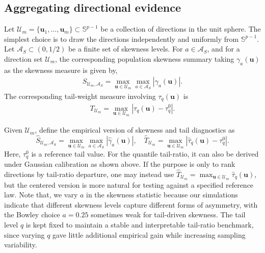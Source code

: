 \documentclass[11pt]{article}
\theoremstyle{plain}
\theoremstyle{definition}
\theoremstyle{remark}
\def\u{\bm{u}}
\newcommand{\abs}[1]{\left\lvert #1 \right\rvert}
\begin{document}
\subsection{Aggregating directional evidence}
\label{subsec:aggregation}

Let $\mathcal U_m=\{\u_1,\ldots,\u_m\}\subset \mathbb{S}^{p-1}$ be a collection of directions in the unit sphere. The simplest choice is to draw the directions independently and uniformly from \(\mathbb{S}^{p-1}\). Let \(\mathcal A_S\subset(0,1/2)\) be a finite set of skewness levels. For \(a\in\mathcal A_S\), and for a direction set \(\mathcal U_m\), the corresponding population skewness summary taking \(\gamma_{a}(\u)\) as the skewness measure is given by,
\begin{align}
S_{\mathcal U_m,\mathcal A_S}
=
\max_{\u\in\mathcal U_m}
\max_{a\in\mathcal A_S}
\abs{\gamma_{a}(\u)}.
\label{eq:skewness_measure}
\end{align}
The corresponding tail-weight measure involving \(\tau_q(\u)\)  is 
\begin{align}
T_{\mathcal U_m} = \max_{\u\in\mathcal U_m} \abs{\tau_q(\u)-\tau_{q}^0}.
\label{eq:tail_measure}
\end{align}

Given \(\mathcal U_m\), define the empirical version of skewness and tail diagnostics as
\begin{equation}
    \widehat S_{\mathcal U_m,\mathcal A_S} = \max_{\u\in\mathcal U_m} \max_{a\in\mathcal A_S} \abs{\widehat\gamma_{a}(\u)}, \quad
    \widehat T_{\mathcal U_m} = \max_{\u\in\mathcal U_m} \abs{\widehat\tau_q(\u)-\tau_{q}^0}.
    \label{eq:empirical_skew_tail_measure}
\end{equation}
Here, \(\tau_{q}^0\) is a reference tail value. For the quantile tail-ratio, it can also be derived under Gaussian calibration as shown above. If the purpose is only to rank directions by tail-ratio departure, one may instead use $\widehat T_{\mathcal U_m} = \max_{\u\in\mathcal U_m} \widehat\tau_q(\u)$, but the centered version is more natural for testing against a specified reference law. Note that, we vary \(a\) in the skewness statistic because our simulations indicate that different skewness levels capture different forms of asymmetry, with the Bowley choice \(a=0.25\) sometimes weak for tail-driven skewness. The tail level \(q\) is kept fixed to maintain a stable and interpretable tail-ratio benchmark, since varying \(q\) gave little additional empirical gain while increasing sampling variability.
\end{document}
